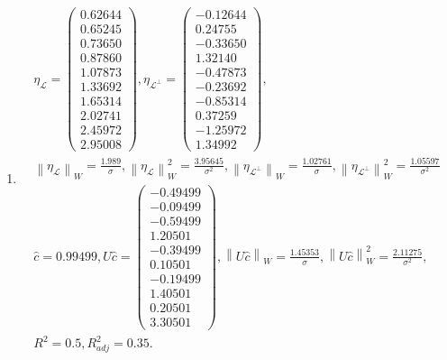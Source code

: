 \documentclass[a4paper,12pt]{article}
\newcommand{\norm}[1]{\left \| #1 \right \|}
\newcommand{\pr}[2]{#1_\mathcal{#2}}
\newcommand{\pro}[2]{#1_{\mathcal{#2}^\perp}}
\begin{document}
\begin{enumerate}
        \item
              \begin{gather*}
                  \pr{\eta}{L} = \begin{pmatrix} 0.62644 \\ 0.65245 \\ 0.73650 \\ 0.87860 \\ 1.07873 \\ 1.33692 \\ 1.65314 \\ 2.02741 \\ 2.45972 \\ 2.95008 \end{pmatrix},
                  \pro{\eta}{L} = \begin{pmatrix} -0.12644 \\ 0.24755 \\ -0.33650 \\ 1.32140 \\ -0.47873 \\ -0.23692 \\ -0.85314 \\ 0.37259 \\ -1.25972 \\ 1.34992 \end{pmatrix} , \\
                  \norm{\pr{\eta}{L}}_W = \frac{1.989}{\sigma} ,
                  \norm{\pr{\eta}{L}}_W^2 = \frac{3.95645}{\sigma^2} ,
                  \norm{\pro{\eta}{L}}_W = \frac{1.02761}{\sigma} ,
                  \norm{\pro{\eta}{L}}_W^2 = \frac{1.05597}{\sigma^2} \\
                  \widehat{c} = 0.99499,
                  U \widehat{c} = \begin{pmatrix} -0.49499 \\ -0.09499 \\ -0.59499 \\ 1.20501 \\ -0.39499 \\ 0.10501 \\ -0.19499 \\ 1.40501 \\ 0.20501 \\ 3.30501 \end{pmatrix},
                  \norm{U \widehat{c}}_W = \frac{1.45353}{\sigma},
                  \norm{U \widehat{c}}_W^2 = \frac{2.11275}{\sigma^2}, \\
                  R^2 = 0.5, R_{adj}^2 = 0.35 .

\end{gather*}
\end{enumerate}
\end{document}
